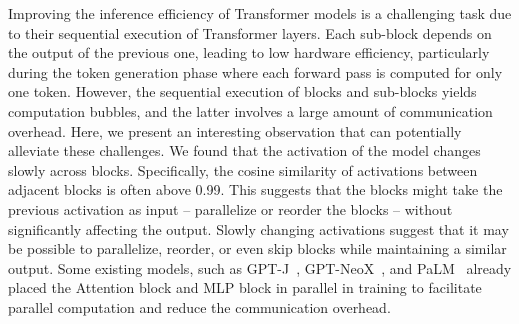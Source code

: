 \begin{table}[ht]
\scriptsize
\centering
{}
\label{table:corruption}
\end{table}


Improving the inference efficiency of Transformer models is a challenging task due to their sequential execution of Transformer layers.
Each sub-block depends on the output of the previous one, leading to low hardware efficiency, particularly during the token generation phase where each forward pass is computed for only one token.
However, the sequential execution of blocks and sub-blocks yields computation bubbles, and the latter involves a large amount of communication overhead. 
Here, we present an interesting observation that can potentially alleviate these challenges. We found that the activation of the model changes slowly across blocks. Specifically, the cosine similarity of activations between adjacent blocks is often above 0.99.
This suggests that the blocks might take the previous activation as input -- parallelize or reorder the blocks -- without significantly affecting the output.
Slowly changing activations suggest that it may be possible to parallelize, reorder, or even skip blocks while maintaining a similar output.
Some existing models, such as GPT-J~\citep{gpt-j}, GPT-NeoX~\citep{gpt-neox-20b}, and PaLM~\citep{chowdhery2022palm} already placed the Attention block and MLP block in parallel in training to facilitate parallel computation and reduce the communication overhead. 

